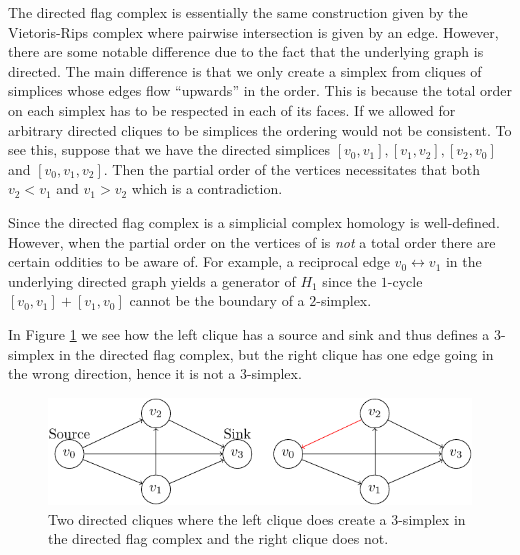 The directed flag complex is essentially the same construction given by the Vietoris-Rips complex where pairwise intersection is given by an edge. However, there are some notable difference due to the fact that the underlying graph is directed. The main difference is that we only create a simplex from cliques of simplices whose edges flow ``upwards'' in the order. This is because the total order on each simplex has to be respected in each of its faces. If we allowed for arbitrary directed cliques to be simplices the ordering would not be consistent. To see this, suppose that we have the directed simplices $[v_{0},v_{1}],[v_1,v_2],[v_{2},v_{0}]$ and $[v_{0},v_{1},v_{2}]$. Then the partial order of the vertices necessitates that both $v_{2} < v_{1}$ and $v_{1} > v_{2}$ which is a contradiction.

Since the directed flag complex is a simplicial complex homology is well-defined. However, when the partial order on the vertices of is \textit{not} a total order there are certain oddities to be aware of. For example, a reciprocal edge $v_{0} \leftrightarrow v_{1}$ in the underlying directed graph yields a generator of $H_{1}$ since the $1$-cycle $[v_{0},v_{1}]+[v_{1},v_{0}]$ cannot be the boundary of a $2$-simplex.

In Figure \ref{disimplex} we see how the left clique has a source and sink and thus defines a $3$-simplex in the directed flag complex, but the right clique has one edge going in the wrong direction, hence it is not a $3$-simplex.


\begin{figure}[ht]
  \centering
  \includegraphics[]{./3simplex.pdf}
  \caption{\label{disimplex} Two directed cliques where the left clique does create a 3-simplex in the directed flag complex and the right clique does not.}
\end{figure}

